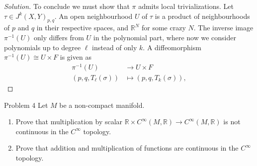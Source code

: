 \begin{proof}[Solution]
To conclude we must show that \(\pi\) admits local trivializations. Let \(\tau \in J^k(X,Y)_{p,q}\). An open neighbourhood \(U\) of \(\tau\) is a product of neighbourhoods of \(p\) and \(q\) in their respective spaces, and \(\mathbb{R}^N\) for some crazy \(N\). The inverse image \(\pi^{-1}(U)\) only differs from \(U\) in the polynomial part, where now we consider polynomials up to degree \(\ell\) instead of only \(k\). A diffeomorphism \(\pi^{-1}(U) \cong U \times F\) is given as 
\begin{align*}
	 \pi^{-1}(U) &\longrightarrow U \times F \\
	 (p,q,T_\ell (\sigma)) &\longmapsto (p,q,T_k(\sigma)),
\end{align*}

\end{proof}

\begin{thing1}{Problem 4}\label{p:4}\leavevmode
Let \(M\) be a non-compact manifold.
\begin{enumerate}[label=(\alph*)]
\item Prove that multiplication by scalar \(\mathbb{R}\times C^\infty (M,\mathbb{R})\to C^\infty (M,\mathbb{R})\) is not continuous in the \(C^\infty \) topology.
\item Prove that addition and multiplication of functions are continuous in the \(C^\infty \) topology.
\end{enumerate}
\end{thing1}

